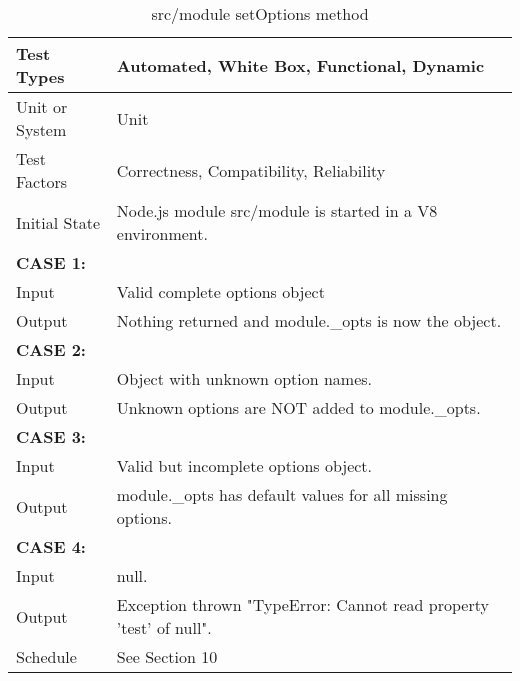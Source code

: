 \documentclass[12pt]{article}
\begin{document}
\begin{table}
\caption{src/module setOptions method}
\begin{tabular}{|p{0.2\linewidth} || p{0.8\linewidth}|}
\hline
Test Types & Automated, White Box, Functional, Dynamic \\
\hline
Unit or System & Unit \\
\hline
Test Factors & Correctness, Compatibility, Reliability\\
\hline
Initial State & Node.js module src/module is started in a V8 environment. \\
\hline
\hline
\textbf{CASE 1:} & \\
Input & Valid complete options object \\
\hline
Output & Nothing returned and module.\_opts is now the object. \\
\hline
\hline
\textbf{CASE 2:} & \\
Input & Object with unknown option names. \\
\hline
Output & Unknown options are NOT added to module.\_opts. \\
\hline
\hline
\textbf{CASE 3:} & \\
Input & Valid but incomplete options object. \\
\hline
Output & module.\_opts has default values for all missing options. \\
\hline
\hline
\textbf{CASE 4:} & \\
Input & null. \\
\hline
Output & Exception thrown "TypeError: Cannot read property 'test' of null". \\
\hline
Schedule & See Section 10 \\
\hline
\end{tabular}
\end{table} 
\end{document}
